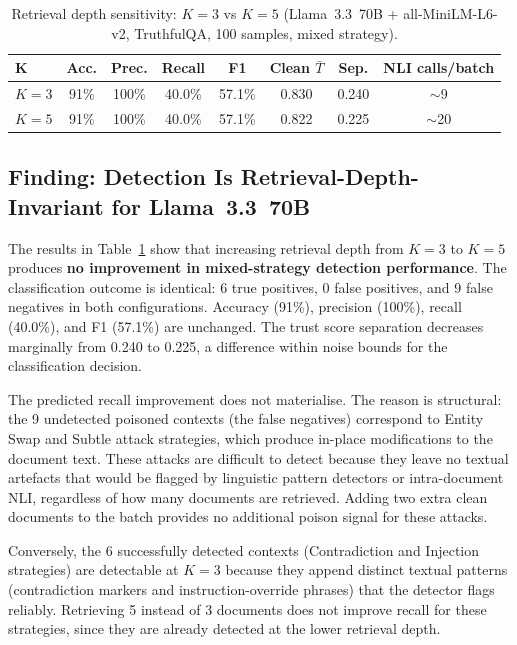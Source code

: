 \begin{table}[h]
\centering
\caption{Retrieval depth sensitivity: $K=3$ vs $K=5$ (Llama~3.3~70B + all-MiniLM-L6-v2,
TruthfulQA, 100 samples, mixed strategy).}
\label{tab:topk_comparison}
\begin{tabular}{lccccccc}
\hline
\textbf{K} & \textbf{Acc.} & \textbf{Prec.} & \textbf{Recall} & \textbf{F1}
    & \textbf{Clean $\bar{T}$} & \textbf{Sep.} & \textbf{NLI calls/batch} \\
\hline
$K=3$ & 91\%  & 100\%  & 40.0\% & 57.1\% & 0.830 & 0.240 & $\sim$9 \\
$K=5$ & 91\%  & 100\%  & 40.0\% & 57.1\% & 0.822 & 0.225 & $\sim$20 \\
\hline
\end{tabular}
\end{table}

\subsection{Finding: Detection Is Retrieval-Depth-Invariant for Llama~3.3~70B}

The results in Table~\ref{tab:topk_comparison} show that increasing retrieval depth from
$K=3$ to $K=5$ produces \textbf{no improvement in mixed-strategy detection performance}.
The classification outcome is identical: 6 true positives, 0 false positives, and 9 false
negatives in both configurations. Accuracy (91\%), precision (100\%), recall (40.0\%), and
F1 (57.1\%) are unchanged. The trust score separation decreases marginally from 0.240 to
0.225, a difference within noise bounds for the classification decision.

The predicted recall improvement does not materialise. The reason is structural: the 9
undetected poisoned contexts (the false negatives) correspond to Entity Swap and Subtle
attack strategies, which produce in-place modifications to the document text. These attacks
are difficult to detect because they leave no textual artefacts that would be flagged by
linguistic pattern detectors or intra-document NLI, regardless of how many documents are
retrieved. Adding two extra clean documents to the batch provides no additional poison signal
for these attacks.

Conversely, the 6 successfully detected contexts (Contradiction and Injection strategies)
are detectable at $K=3$ because they append distinct textual patterns (contradiction markers
and instruction-override phrases) that the detector flags reliably. Retrieving 5 instead of
3 documents does not improve recall for these strategies, since they are already detected at
the lower retrieval depth.

